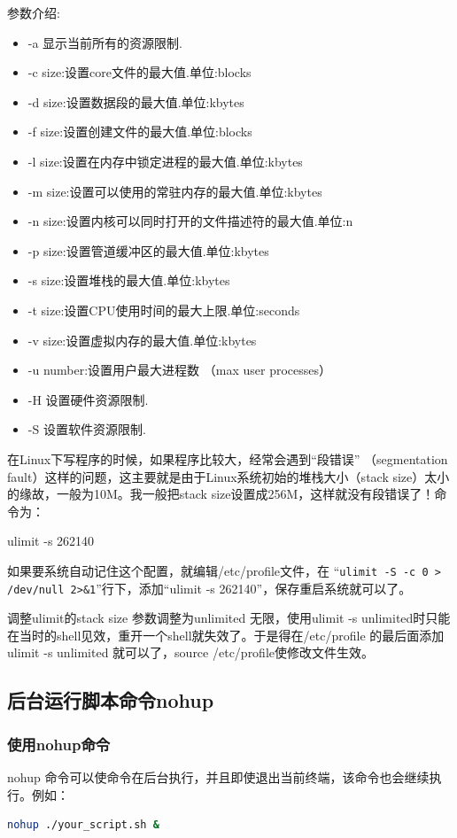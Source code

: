 参数介绍:
\begin{itemize}
\item -a 显示当前所有的资源限制.
\item -c size:设置core文件的最大值.单位:blocks
\item -d size:设置数据段的最大值.单位:kbytes
\item -f size:设置创建文件的最大值.单位:blocks
\item -l size:设置在内存中锁定进程的最大值.单位:kbytes
\item -m size:设置可以使用的常驻内存的最大值.单位:kbytes
\item -n size:设置内核可以同时打开的文件描述符的最大值.单位:n
\item -p size:设置管道缓冲区的最大值.单位:kbytes
\item -s size:设置堆栈的最大值.单位:kbytes
\item -t size:设置CPU使用时间的最大上限.单位:seconds
\item -v size:设置虚拟内存的最大值.单位:kbytes
\item -u number:设置用户最大进程数 （max user processes）
\item -H 设置硬件资源限制.
\item -S 设置软件资源限制.
\end{itemize}

在Linux下写程序的时候，如果程序比较大，经常会遇到“段错误” （segmentation fault）这样的问题，这主要就是由于Linux系统初始的堆栈大小（stack size）太小的缘故，一般为10M。我一般把stack size设置成256M，这样就没有段错误了！命令为：

ulimit   -s 262140

如果要系统自动记住这个配置，就编辑/etc/profile文件，在 “\verb|ulimit -S -c 0 > /dev/null 2>&1|”行下，添加“ulimit   -s 262140”，保存重启系统就可以了。

调整ulimit的stack size 参数调整为unlimited 无限，使用ulimit -s unlimited时只能在当时的shell见效，重开一个shell就失效了。于是得在/etc/profile 的最后面添加ulimit -s unlimited 就可以了，source /etc/profile使修改文件生效。



\subsection{后台运行脚本命令nohup}
\subsubsection{使用nohup命令}
nohup 命令可以使命令在后台执行，并且即使退出当前终端，该命令也会继续执行。例如：
\begin{lstlisting}[language=sh]
nohup ./your_script.sh &
\end{lstlisting}



